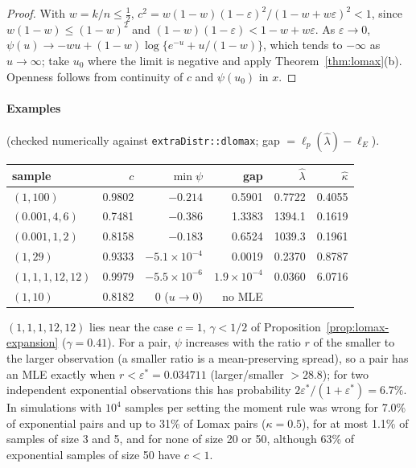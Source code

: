 \documentclass[11pt]{article}
\newcommand{\code}[1]{\texttt{#1}}
\theoremstyle{plain}
\theoremstyle{definition}
\theoremstyle{remark}
\begin{document}
\begin{proof}
With $w = k/n\le\frac12$,
$c^2 = w(1-w)(1-\varepsilon)^2/(1-w+w\varepsilon)^2 < 1$, since
$w(1-w)\le(1-w)^2$ and $(1-w)(1-\varepsilon) < 1-w+w\varepsilon$. As
$\varepsilon\to0$, $\psi(u)\to -wu + (1-w)\log\{e^{-u} + u/(1-w)\}$, which
tends to $-\infty$ as $u\to\infty$; take $u_0$ where the limit is negative
and apply Theorem~\ref{thm:lomax}(b). Openness follows from continuity of $c$
and $\psi(u_0)$ in $x$.
\end{proof}

\paragraph{Examples} (checked numerically against
\code{extraDistr::dlomax}; gap $=\ell_p(\hat\lambda)-\ell_E$).

\begin{center}
\small
\begin{tabular}{@{}lrrrrr@{}}
\toprule
sample & $c$ & $\min\psi$ & gap & $\hat\lambda$ & $\hat\kappa$ \\
\midrule
$(1, 100)$ & 0.9802 & $-0.214$ & 0.5901 & 0.7722 & 0.4055 \\
$(0.001, 4, 6)$ & 0.7481 & $-0.386$ & 1.3383 & 1394.1 & 0.1619 \\
$(0.001, 1, 2)$ & 0.8158 & $-0.183$ & 0.6524 & 1039.3 & 0.1961 \\
$(1, 29)$ & 0.9333 & $-5.1\times10^{-4}$ & 0.0019 & 0.2370 & 0.8787 \\
$(1, 1, 1, 12, 12)$ & 0.9979 & $-5.5\times10^{-6}$ & $1.9\times10^{-4}$ & 0.0360 & 6.0716 \\
$(1, 10)$ & 0.8182 & $0$ ($u\to0$) & no MLE & & \\
\bottomrule
\end{tabular}
\end{center}

$(1,1,1,12,12)$ lies near the case $c = 1$, $\gamma < 1/2$ of
Proposition~\ref{prop:lomax-expansion} ($\gamma = 0.41$). For a pair, $\psi$ increases
with the ratio $r$ of the smaller to the larger observation (a smaller ratio
is a mean-preserving spread), so a pair has an MLE exactly when
$r<\varepsilon^\ast = 0.034711$ (larger/smaller $> 28.8$); for two
independent exponential observations this has probability
$2\varepsilon^\ast/(1+\varepsilon^\ast) = 6.7\%$. In simulations with
$10^4$ samples per setting the moment rule was wrong for 7.0\% of
exponential pairs and up to 31\% of Lomax pairs ($\kappa = 0.5$), for at most
1.1\% of samples of size 3 and 5, and for none of size 20 or 50, although
63\% of exponential samples of size 50 have $c<1$.
\end{document}
